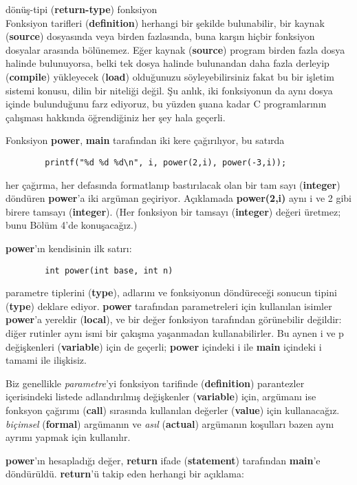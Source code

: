 \documentclass[a4paper,12pt,oneside]{book}
\begin{document}
dönüş-tipi (\textbf{return-type}) fonksiyon  \pagebreak \\
\noindent Fonksiyon tarifleri (\textbf{definition}) herhangi bir şekilde bulunabilir, bir kaynak (\textbf{source}) dosyasında veya birden fazlasında, buna karşın hiçbir fonksiyon  dosyalar arasında bölünemez. Eğer kaynak (\textbf{source}) program birden fazla dosya halinde bulunuyorsa, belki tek dosya halinde bulunandan daha fazla derleyip (\textbf{compile}) yükleyecek (\textbf{load}) olduğunuzu söyleyebilirsiniz fakat bu bir işletim sistemi konusu, dilin bir niteliği değil. Şu anlık, iki fonksiyonun  da aynı dosya içinde bulunduğunu farz ediyoruz, bu yüzden şuana kadar C programlarının çalışması hakkında öğrendiğiniz her şey hala geçerli.
\par Fonksiyon  \textbf{power}, \textbf{main} tarafından iki kere çağırılıyor, bu satırda
\begin{lstlisting}
		printf("%d %d %d\n", i, power(2,i), power(-3,i));
\end{lstlisting}
her çağırma, her defasında formatlanıp bastırılacak olan bir tam sayı (\textbf{integer}) döndüren \textbf{power}'a iki argüman geçiriyor. Açıklamada \textbf{power(2,i)} aynı i ve 2 gibi birere tamsayı (\textbf{integer}). (Her fonksiyon  bir tamsayı (\textbf{integer}) değeri üretmez; bunu Bölüm 4'de konuşacağız.)
\par \textbf{power}'ın kendisinin ilk satırı:
\begin{lstlisting}
		int power(int base, int n)
\end{lstlisting}
parametre tiplerini (\textbf{type}), adlarını ve fonksiyonun  döndüreceği sonucun tipini (\textbf{type}) deklare ediyor. \textbf{power} tarafından parametreleri için kullanılan isimler \textbf{power}'a yereldir (\textbf{local}), ve bir değer fonksiyon  tarafından görünebilir değildir: diğer rutinler aynı ismi bir çakışma yaşanmadan kullanabilirler. Bu aynen i ve p değişkenleri (\textbf{variable}) için de geçerli; \textbf{power} içindeki i ile \textbf{main} içindeki i tamami ile ilişkisiz.
\par Biz genellikle \textit{parametre}'yi fonksiyon  tarifinde (\textbf{definition}) parantezler içerisindeki listede adlandırılmış değişkenler (\textbf{variable}) için, argümanı ise fonksyon çağırımı (\textbf{call}) sırasında kullanılan değerler (\textbf{value}) için kullanacağız. \textit{biçimsel} (\textbf{formal}) argümanın ve \textit{asıl} (\textbf{actual}) argümanın koşulları bazen aynı ayrımı yapmak için kullanılır.
\par \textbf{power}'ın hesapladığı değer, \textbf{return} ifade (\textbf{statement}) tarafından \textbf{main}'e döndürüldü. \textbf{return}'ü takip eden herhangi bir açıklama:
\end{document}
